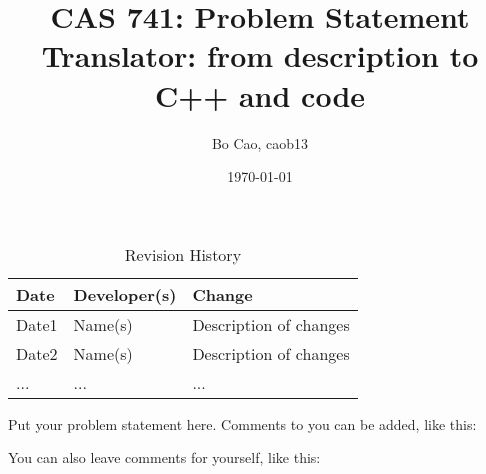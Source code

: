 \documentclass{article}
\title{CAS 741: Problem Statement\\Translator: from description to C++ and \latex code}
\author{Bo Cao, caob13}
\date{\today}
\begin{document}
\maketitle

\begin{table}[hp]
\caption{Revision History} \label{TblRevisionHistory}
\begin{tabularx}{\textwidth}{llX}
\toprule
\textbf{Date} & \textbf{Developer(s)} & \textbf{Change}\\
\midrule
Date1 & Name(s) & Description of changes\\
Date2 & Name(s) & Description of changes\\
... & ... & ...\\
\bottomrule
\end{tabularx}
\end{table}

Put your problem statement here.  Comments to you can be added, like this:


You can also leave comments for yourself, like this:

\end{document}
